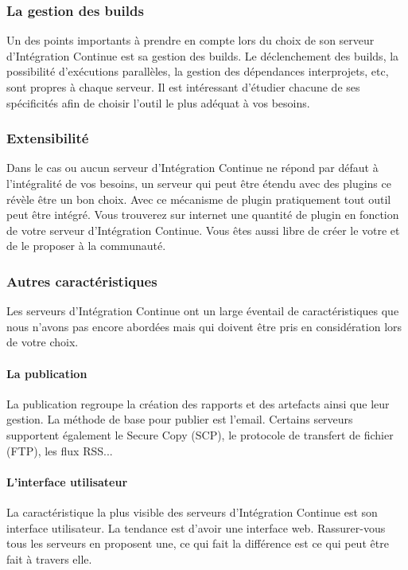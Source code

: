       \subsubsection{La gestion des builds}
      Un des points importants à prendre en compte lors du choix de son serveur d'Intégration Continue est sa gestion des builds. Le déclenchement des builds, la possibilité d'exécutions parallèles, la gestion des dépendances interprojets, etc, sont propres à chaque serveur. Il est intéressant d'étudier chacune de ses spécificités afin de choisir l'outil le plus adéquat à vos besoins.

      \subsubsection{Extensibilité}
      Dans le cas ou aucun serveur d'Intégration Continue ne répond par défaut à l'intégralité de vos besoins, un serveur qui peut être étendu avec des plugins ce révèle être un bon choix. Avec ce mécanisme de plugin pratiquement tout outil peut être intégré. Vous trouverez sur internet une quantité de plugin en fonction de votre serveur d'Intégration Continue. Vous êtes aussi libre de créer le votre et de le proposer à la communauté.

      \subsubsection{Autres caractéristiques}
      Les serveurs d'Intégration Continue ont un large éventail de caractéristiques que nous n'avons pas encore abordées mais qui doivent être pris en considération lors de votre choix.
      \paragraph{La publication} La publication regroupe la création des rapports et des artefacts ainsi que leur gestion. La méthode de base pour publier est l'email. Certains serveurs supportent également le Secure Copy (SCP), le protocole de transfert de fichier (FTP), les flux RSS...
      \paragraph{L'interface utilisateur} La caractéristique la plus visible des serveurs d'Intégration Continue est son interface utilisateur. La tendance est d'avoir une interface web. Rassurer-vous tous les serveurs en proposent une, ce qui fait la différence est ce qui peut être fait à travers elle.
